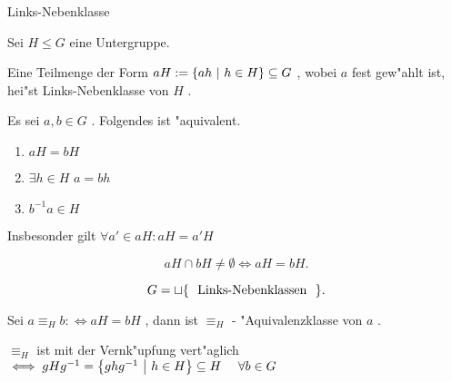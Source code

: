\documentclass[class=article, crop=false]{standalone}
\begin{document}
\begin{zettel}{Links-Nebenklasse}
\begin{flashcard}[]{}
	\begin{definition}
		Sei $H \leq G$ eine Untergruppe.

		Eine Teilmenge der Form $aH := \set{ah}{h \in  H} \subseteq G$ , wobei $a$ fest gew"ahlt ist, hei"st Links-Nebenklasse von $H$ .
	\end{definition}
\end{flashcard}

\begin{lemma}
	Es sei $a,b \in  G$ . Folgendes ist "aquivalent.
	\begin{enumerate}
		\item $aH =  bH$
		\item $\exists  h \in  H$  $a =  bh$
		\item $b^{-1} a \in  H$
	\end{enumerate}
	Insbesonder gilt $\forall a' \in  aH : aH =  a'H$
\end{lemma}

\begin{corollary}
	\[
		aH \cap bH \neq  \emptyset \iff  aH =  bH
	.\]
\end{corollary}

\begin{corollary}
	\[
		G =  \sqcup \set{\tx{ Links-Nebenklassen } }
	.\]
\end{corollary}

Sei $a \equiv_H b :\iff aH = bH$ , dann ist $\equiv_H$ - "Aquivalenzklasse von $a$ .

\begin{theorem}
	$\equiv_H$ ist mit der Vernk"upfung vert"aglich $\iff gHg^{-1} = \set{ghg^{-1} }{h \in  H} \subseteq H \quad \forall b \in  G$
\end{theorem}

\end{zettel}
\end{document}
